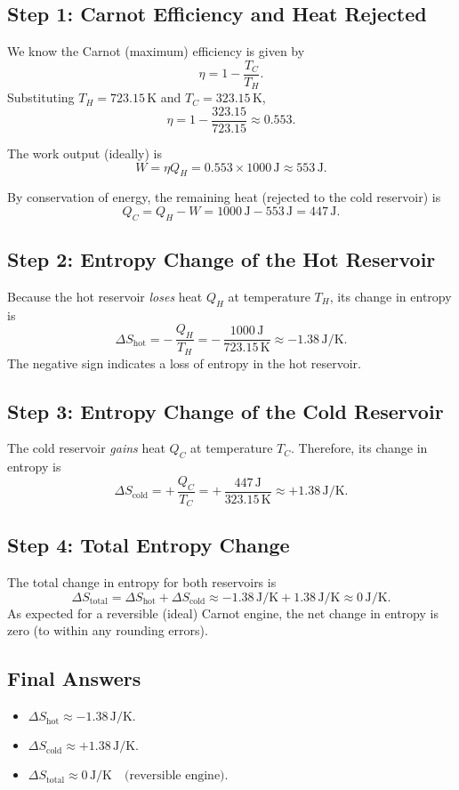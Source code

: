 \documentclass[12pt]{article}
\theoremstyle{definition} %
\theoremstyle{plain} %
\begin{document}
\subsection*{Step 1: Carnot Efficiency and Heat Rejected}

We know the Carnot (maximum) efficiency is given by
\[
\eta = 1 - \frac{T_C}{T_H}.
\]
Substituting \(T_H = 723.15\,\mathrm{K}\) and \(T_C = 323.15\,\mathrm{K}\),
\[
\eta = 1 - \frac{323.15}{723.15} \approx 0.553.
\]

The work output (ideally) is
\[
W = \eta Q_H = 0.553 \times 1000\,\mathrm{J} \approx 553\,\mathrm{J}.
\]

By conservation of energy, the remaining heat (rejected to the cold reservoir) is
\[
Q_C = Q_H - W = 1000\,\mathrm{J} - 553\,\mathrm{J} = 447\,\mathrm{J}.
\]

\subsection*{Step 2: Entropy Change of the Hot Reservoir}

Because the hot reservoir \emph{loses} heat \(Q_H\) at temperature \(T_H\), its change in entropy is
\[
\Delta S_{\text{hot}} = -\,\frac{Q_H}{T_H}
= -\,\frac{1000\,\mathrm{J}}{723.15\,\mathrm{K}}
\approx -1.38\,\mathrm{J/K}.
\]
The negative sign indicates a loss of entropy in the hot reservoir.

\subsection*{Step 3: Entropy Change of the Cold Reservoir}

The cold reservoir \emph{gains} heat \(Q_C\) at temperature \(T_C\). Therefore, its change in entropy is
\[
\Delta S_{\text{cold}} 
= +\,\frac{Q_C}{T_C}
= +\,\frac{447\,\mathrm{J}}{323.15\,\mathrm{K}}
\approx +1.38\,\mathrm{J/K}.
\]

\subsection*{Step 4: Total Entropy Change}

The total change in entropy for both reservoirs is
\[
\Delta S_{\text{total}}
= \Delta S_{\text{hot}} + \Delta S_{\text{cold}}
\approx -1.38\,\mathrm{J/K} + 1.38\,\mathrm{J/K} \approx 0\,\mathrm{J/K}.
\]
As expected for a reversible (ideal) Carnot engine, the net change in entropy is zero (to within any rounding errors).

\subsection*{Final Answers}
\begin{itemize}
    \item \(\displaystyle \Delta S_{\text{hot}} \approx -1.38 \,\mathrm{J/K}.\)
    \item \(\displaystyle \Delta S_{\text{cold}} \approx +1.38 \,\mathrm{J/K}.\)
    \item \(\displaystyle \Delta S_{\text{total}} \approx 0 \,\mathrm{J/K} \quad \text{(reversible engine).}\)
\end{itemize}
\end{document}
